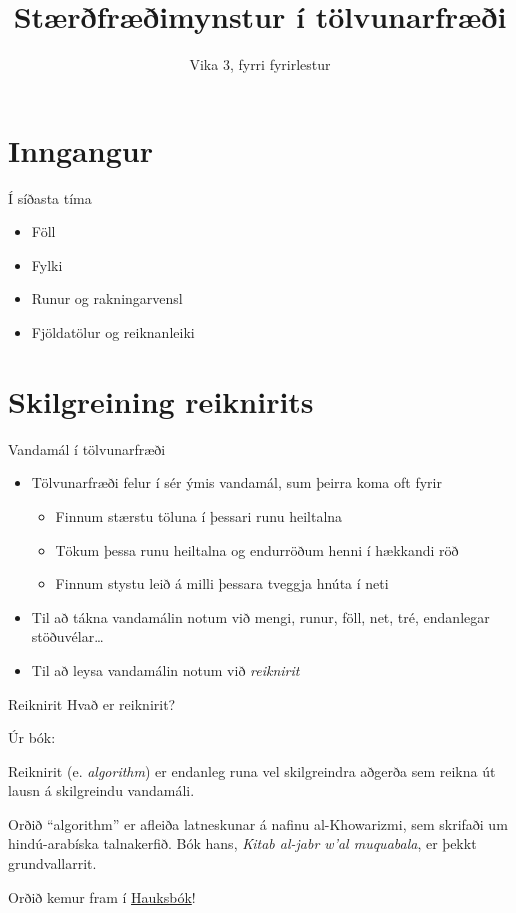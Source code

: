 \documentclass[handout]{beamer}
\title{Stærðfræðimynstur í tölvunarfræði}
\subtitle{Vika 3, fyrri fyrirlestur}
\begin{document}
\begin{frame}
\titlepage
\end{frame}

\section{Inngangur}

\begin{frame}{Í síðasta tíma}
\begin{itemize}
 \item Föll
 \item Fylki
 \item Runur og rakningarvensl
 \item Fjöldatölur og reiknanleiki
\end{itemize}
\end{frame}

\section{Skilgreining reiknirits}

\begin{frame}{Vandamál í tölvunarfræði}
\begin{itemize}
 \item Tölvunarfræði felur í sér ýmis vandamál, sum þeirra koma oft fyrir
 \begin{itemize}
  \item Finnum stærstu töluna í þessari runu heiltalna
  \item Tökum þessa runu heiltalna og endurröðum henni í hækkandi röð
  \item Finnum stystu leið á milli þessara tveggja hnúta í neti
 \end{itemize}
 \item Til að tákna vandamálin notum við mengi, runur, föll, net, tré, endanlegar stöðuvélar\ldots
 \item Til að leysa vandamálin notum við \emph{reiknirit}
\end{itemize}
\end{frame}

\begin{frame}{Reiknirit}
Hvað er reiknirit? \pause

Úr bók:
\begin{tcolorbox}[title=Reiknirit]
Reiknirit (e. \emph{algorithm}) er endanleg runa vel skilgreindra aðgerða sem reikna út lausn á skilgreindu vandamáli.
\end{tcolorbox}

Orðið ``algorithm'' er afleiða latneskunar á nafinu al-Khowarizmi, sem skrifaði um hindú-arabíska talnakerfið. Bók hans, \emph{Kitab al-jabr w'al muquabala}, er þekkt grundvallarrit.

\pause
Orðið kemur fram í \href{https://en.wikipedia.org/wiki/Hauksb\%C3\%B3k}{Hauksbók}!
\end{frame}
\end{document}

